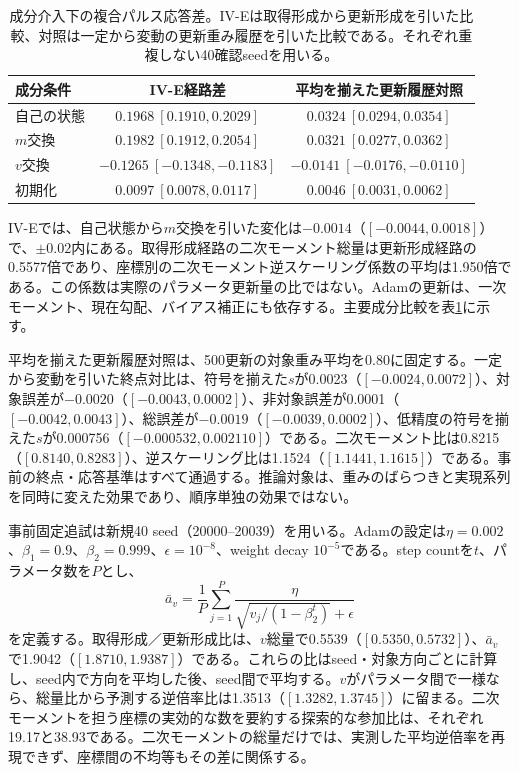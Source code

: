\begin{table}[h]
\centering\small
\caption{成分介入下の複合パルス応答差。IV-Eは取得形成から更新形成を引いた比較、対照は一定から変動の更新重み履歴を引いた比較である。それぞれ重複しない40確認seedを用いる。}
\label{tab:components}
\begin{tabular}{lcc}
\toprule
成分条件 & IV-E経路差 & 平均を揃えた更新履歴対照\\
\midrule
自己の状態 & $0.1968\ [0.1910,0.2029]$ & $0.0324\ [0.0294,0.0354]$\\
$m$交換 & $0.1982\ [0.1912,0.2054]$ & $0.0321\ [0.0277,0.0362]$\\
$v$交換 & $-0.1265\ [-0.1348,-0.1183]$ & $-0.0141\ [-0.0176,-0.0110]$\\
初期化 & $0.0097\ [0.0078,0.0117]$ & $0.0046\ [0.0031,0.0062]$\\
\bottomrule
\end{tabular}
\end{table}

IV-Eでは、自己状態から$m$交換を引いた変化は$-0.0014$（$[-0.0044,0.0018]$）で、$\pm0.02$内にある。取得形成経路の二次モーメント総量は更新形成経路の0.5577倍であり、座標別の二次モーメント逆スケーリング係数の平均は1.950倍である。この係数は実際のパラメータ更新量の比ではない。Adamの更新は、一次モーメント、現在勾配、バイアス補正にも依存する。主要成分比較を表\ref{tab:components}に示す。

平均を揃えた更新履歴対照は、500更新の対象重み平均を0.80に固定する。一定から変動を引いた終点対比は、符号を揃えた$s$が0.0023（$[-0.0024,0.0072]$）、対象誤差が$-0.0020$（$[-0.0043,0.0002]$）、非対象誤差が0.0001（$[-0.0042,0.0043]$）、総誤差が$-0.0019$（$[-0.0039,0.0002]$）、低精度の符号を揃えた$s$が0.000756（$[-0.000532,0.002110]$）である。二次モーメント比は0.8215（$[0.8140,0.8283]$）、逆スケーリング比は1.1524（$[1.1441,1.1615]$）である。事前の終点・応答基準はすべて通過する。推論対象は、重みのばらつきと実現系列を同時に変えた効果であり、順序単独の効果ではない。

事前固定追試は新規40 seed（20000--20039）を用いる。Adamの設定は$\eta=0.002$、$\beta_1=0.9$、$\beta_2=0.999$、$\epsilon=10^{-8}$、weight decay $10^{-5}$である。step countを$t$、パラメータ数を$P$とし、
\begin{equation}
\bar a_v=\frac{1}{P}\sum_{j=1}^{P}\frac{\eta}{\sqrt{v_j/(1-\beta_2^t)}+\epsilon}
\end{equation}
を定義する。取得形成／更新形成比は、$v$総量で0.5539（$[0.5350,0.5732]$）、$\bar a_v$で1.9042（$[1.8710,1.9387]$）である。これらの比はseed・対象方向ごとに計算し、seed内で方向を平均した後、seed間で平均する。$v$がパラメータ間で一様なら、総量比から予測する逆倍率比は1.3513（$[1.3282,1.3745]$）に留まる。二次モーメントを担う座標の実効的な数を要約する探索的な参加比は、それぞれ19.17と38.93である。二次モーメントの総量だけでは、実測した平均逆倍率を再現できず、座標間の不均等もその差に関係する。

